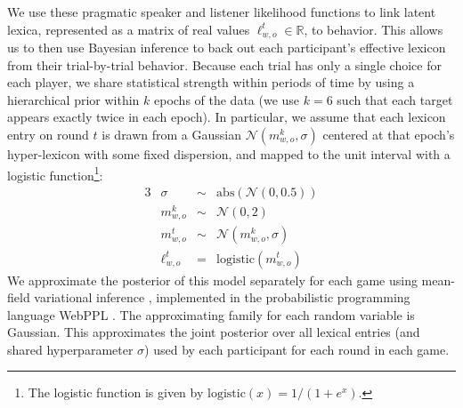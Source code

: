 \documentclass[10pt,letterpaper]{article}
\newcommand{\ndg}[1]{\textcolor{Green}{[ndg: #1]}}
\begin{document}
We use these pragmatic speaker and listener likelihood functions to link latent lexica, represented as a matrix of real values $\ell_{w,o}^t \in \mathbb{R}$, to behavior.
This allows us to then use Bayesian inference to back out each participant's effective lexicon from their trial-by-trial behavior.
Because each trial has only a single choice for each player, we share statistical strength within periods of time by using a hierarchical prior within $k$ epochs of the data (we use $k=6$ such that each target appears exactly twice in each epoch). 
In particular, we assume that each lexicon entry on round $t$ is drawn from a Gaussian $\mathcal{N}(m^{k}_{w,o}, \sigma)$ centered at that epoch's hyper-lexicon with some fixed dispersion, and mapped to the unit interval with a logistic function\footnote{The logistic function is given by $\text{logistic}(x) = 1/(1 + e^{x})$.}:
\begin{alignat*}{3}
& \sigma & \sim & \textrm{abs}(\mathcal{N}(0, 0.5)) \\
& m_{w,o}^k &\sim& \mathcal{N}(0, 2)\\
& m_{w,o}^t &\sim& \mathcal{N}(m_{w,o}^k,  \sigma)\\
& \ell_{w,o}^t &=& \text{logistic}(m_{w,o}^t)
\end{alignat*}
We approximate the posterior of this model separately for each game using mean-field variational inference \cite{RanganathGerrishBlei13_BlackBoxVariationalInference}, implemented in the probabilistic programming language WebPPL \cite{GoodmanStuhlmuller14_DIPPL,DAIPP}. 
The approximating family for each random variable is Gaussian. This approximates the joint posterior over all lexical entries (and shared hyperparameter $\sigma$) used by each participant for each round in each game. 



\end{document}

